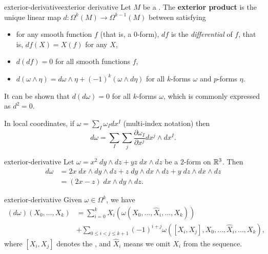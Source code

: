 \begin{topic}{exterior-derivative}{exterior derivative}
    Let $M$ be a . The \textbf{exterior product} is the unique linear map $d : \Omega^k(M) \to \Omega^{k - 1}(M)$ between  satisfying
    \begin{itemize}
        \item for any smooth function $f$ (that is, a $0$-form), $df$ is the \textit{differential} of $f$, that is, $df(X) = X(f)$ for any  $X$,
        \item $d(df) = 0$ for all smooth functions $f$,
        \item $d(\omega \wedge \eta) = d \omega \wedge \eta + (-1)^k (\omega \wedge d\eta)$ for all $k$-forms $\omega$ and $p$-forms $\eta$.
    \end{itemize}
    It can be shown that $d(d\omega) = 0$ for all $k$-forms $\omega$, which is commonly expressed as $d^2 = 0$.
    
    In local coordinates, if $\omega = \sum_I \omega_I dx^I$ (multi-index notation) then
    \[ d \omega = \sum_I \sum_j \frac{\partial \omega_I}{\partial x^j} dx^j \wedge dx^I . \]
\end{topic}

\begin{example}{exterior-derivative}
    Let $\omega = x^2 \; dy \wedge dz + yz \; dx \wedge dz$ be a $2$-form on $\mathbb{R}^3$. Then
    \[ \begin{aligned}
        d\omega
            &= 2x \; dx \wedge dy \wedge dz + z \; dy \wedge dx \wedge dz + y \; dz \wedge dx \wedge dz \\
            &= (2x - z) \; dx \wedge dy \wedge dz .
    \end{aligned} \]
\end{example}

\begin{example}{exterior-derivative}
    Given $\omega \in \Omega^k$, we have
    \[ \begin{aligned} (d\omega)(X_0, \ldots, X_k) &= \sum_{i = 0}^{k} X_i\left( \omega\left(X_0, \ldots, \widehat{X}_i, \ldots, X_k \right) \right) \\ &+ \sum_{0 \le i < j \le k + 1} (-1)^{i + j} \omega\left([X_i, X_j], X_0, \ldots, \widehat{X}_i, \ldots, X_k \right) , \end{aligned} \]
    where $[X_i, X_j]$ denotes the , and $\hat{X}_i$ means we omit $X_i$ from the sequence.
\end{example}

